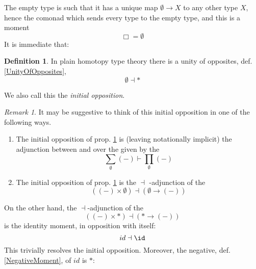 \documentclass[12pt,titlepage]{article}
\theoremstyle{plain}
\theoremstyle{definition}
\newtheorem{defn}{Definition}
\theoremstyle{remark}
\newtheorem{remark}{Remark}
\begin{document}
The empty type is such that it has a unique map $\emptyset \to X$ to any other type $X$, hence the comonad which sends every type to the empty type, and this is a moment
\begin{displaymath}
\Box = \emptyset
\end{displaymath}
It is immediate that:
\begin{defn}
\label{InitialOpposition}\hypertarget{InitialOpposition}{}
In plain homotopy type theory there is a unity of opposites, def. \ref{UnityOfOpposites},
\begin{displaymath}
\emptyset \dashv \ast
\end{displaymath}
\end{defn}
We also call this the \emph{initial opposition}.
\begin{remark}
\label{AspectsOfTheInitialOpposition}\hypertarget{AspectsOfTheInitialOpposition}{}
It may be suggestive to think of this initial opposition in one of the following ways.
\begin{enumerate}%
\item The initial opposition of prop. \ref{InitialOpposition} is (leaving  notationally implicit) the adjunction between  and  over the  given by the 
\begin{displaymath}
\underset{\emptyset}{\sum}(-)
\vdash
\underset{\emptyset}{\prod}(-)
\end{displaymath}
\item The initial opposition of prop. \ref{InitialOpposition} is the  $\dashv$ -adjunction of the 
\begin{displaymath}
\left(
(-) \times \emptyset
\right)
\dashv
\left(
\emptyset \to (-)
\right)
\end{displaymath}
\end{enumerate}
On the other hand, the $\dashv$-adjunction of the 
\begin{displaymath}
\left(
(-) \times \ast
\right)
\dashv
\left(
\ast \to (-)
\right)
\end{displaymath}
is the identity moment, in opposition with itself:
\begin{displaymath}
id \dashv \id
\end{displaymath}
This trivially resolves the initial opposition. Moreover, the negative, def. \ref{NegativeMoment}, of $id$ is $\ast$:

\end{remark}
\end{document}
